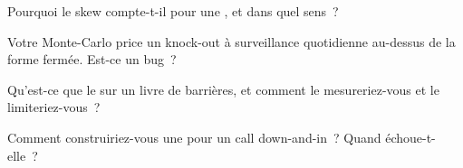 \begin{interviewq}\label{iq:dv:barriers-and-digitals:3}
Pourquoi le skew compte-t-il pour une , et dans quel sens~?
\end{interviewq}

\begin{interviewq}\label{iq:dv:barriers-and-digitals:4}
Votre Monte-Carlo price un knock-out à surveillance quotidienne au-dessus de la forme fermée. Est-ce un bug~?
\end{interviewq}

\begin{interviewq}\label{iq:dv:barriers-and-digitals:5}
Qu'est-ce que le  sur un livre de barrières, et comment le mesureriez-vous et le limiteriez-vous~?
\end{interviewq}

\begin{interviewq}\label{iq:dv:barriers-and-digitals:6}
Comment construiriez-vous une  pour un call down-and-in~? Quand échoue-t-elle~?
\end{interviewq}
